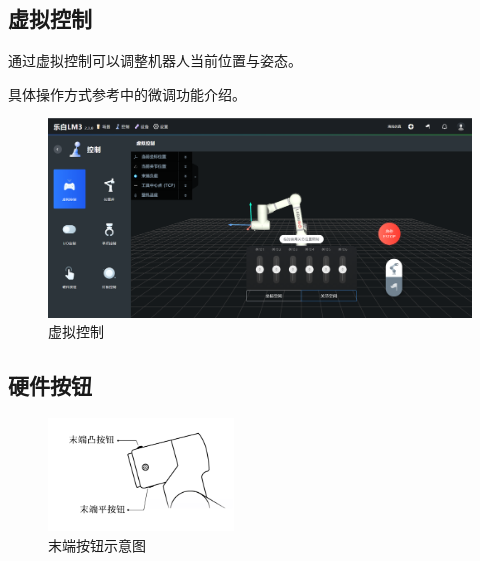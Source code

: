 \subsection{虚拟控制}
通过虚拟控制可以调整机器人当前位置与姿态。

具体操作方式参考中的微调功能介绍。

\begin{figure}[ht]
	\centering
	\includegraphics[width=\textwidth]{image/07/图3.22 虚拟控制.png}
	\caption{虚拟控制}
	\label{fig:虚拟控制示意图}
\end{figure}

\subsection{硬件按钮}
\label{sec:硬件按钮}

\begin{figure}[ht]
	\centering
	\includegraphics[height=3cm]{line_graphs/flange_buttons.pdf}
	\caption{末端按钮示意图}
	\label{fig:末端按钮示意图}
\end{figure}

